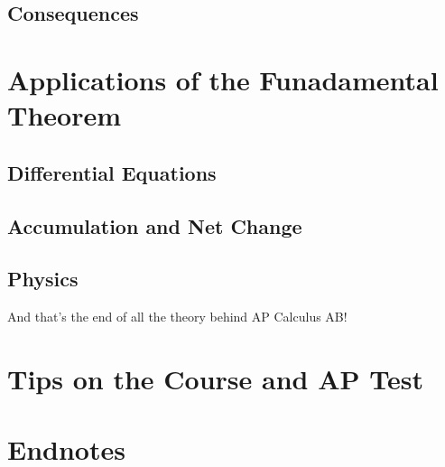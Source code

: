 \documentclass{article}
\begin{document}
\subsection{Consequences}
\newpage
\section{Applications of the Funadamental Theorem}
\subsection{Differential Equations}
\subsection{Accumulation and Net Change}\newpage
\subsection{Physics}
\newline\vspace{2in}
\begin{center}
And that's the end of all the theory behind AP Calculus AB!
\end{center}
\newpage
\section{Tips on the Course and AP Test}\newpage
\section{Endnotes}
\end{document}
